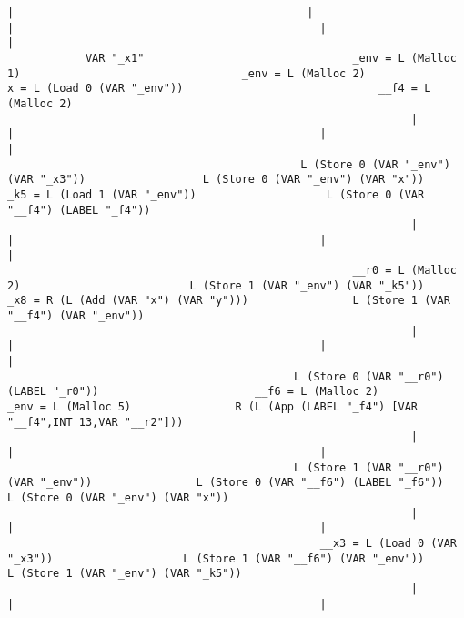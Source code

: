 \begin{landscape}
\begin{lstlisting}[basicstyle=\fontsize{6}{7}\selectfont\ttfamily]
                |                                             |                                                    |                                               |                                                    |
            VAR "_x1"                                _env = L (Malloc 1)                                  _env = L (Malloc 2)                         x = L (Load 0 (VAR "_env"))                              __f4 = L (Malloc 2)
                                                              |                                                    |                                               |                                                    |
                                             L (Store 0 (VAR "_env") (VAR "_x3"))                  L (Store 0 (VAR "_env") (VAR "x"))                _k5 = L (Load 1 (VAR "_env"))                    L (Store 0 (VAR "__f4") (LABEL "_f4"))
                                                              |                                                    |                                               |                                                    |
                                                     __r0 = L (Malloc 2)                          L (Store 1 (VAR "_env") (VAR "_k5"))           _x8 = R (L (Add (VAR "x") (VAR "y")))                L (Store 1 (VAR "__f4") (VAR "_env"))
                                                              |                                                    |                                               |                                                    |
                                            L (Store 0 (VAR "__r0") (LABEL "_r0"))                        __f6 = L (Malloc 2)                             _env = L (Malloc 5)                R (L (App (LABEL "_f4") [VAR "__f4",INT 13,VAR "__r2"]))
                                                              |                                                    |                                               |
                                            L (Store 1 (VAR "__r0") (VAR "_env"))                L (Store 0 (VAR "__f6") (LABEL "_f6"))            L (Store 0 (VAR "_env") (VAR "x"))
                                                              |                                                    |                                               |
                                                __x3 = L (Load 0 (VAR "_x3"))                    L (Store 1 (VAR "__f6") (VAR "_env"))            L (Store 1 (VAR "_env") (VAR "_k5"))
                                                              |                                                    |                                               |

\end{lstlisting}
\end{landscape}
